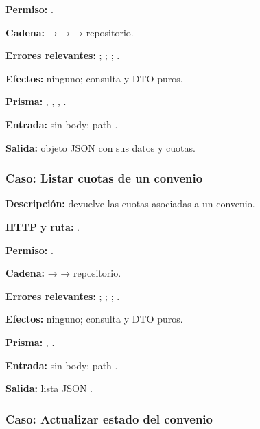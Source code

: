 \textbf{Permiso:} \texttt{}.  

\textbf{Cadena:} \texttt{} → \texttt{} → \texttt{} → repositorio.  

\textbf{Errores relevantes:} \texttt{}; \texttt{}; \texttt{}; \texttt{}.  

\textbf{Efectos:} ninguno; consulta y DTO puros.  

\textbf{Prisma:} \texttt{}, \texttt{}, \texttt{}, \texttt{}.  

\textbf{Entrada:} sin body; path \texttt{}.  

\textbf{Salida:} objeto JSON \texttt{} con sus datos y cuotas.


\subsubsection{Caso: Listar cuotas de un convenio}


\textbf{Descripción:} devuelve las cuotas asociadas a un convenio.  

\textbf{HTTP y ruta:} \texttt{}.  

\textbf{Permiso:} \texttt{}.  

\textbf{Cadena:} \texttt{} → \texttt{} → repositorio.  

\textbf{Errores relevantes:} \texttt{}; \texttt{}; \texttt{}; \texttt{}.  

\textbf{Efectos:} ninguno; consulta y DTO puros.  

\textbf{Prisma:} \texttt{}, \texttt{}.  

\textbf{Entrada:} sin body; path \texttt{}.  

\textbf{Salida:} lista JSON \texttt{}.


\subsubsection{Caso: Actualizar estado del convenio}


